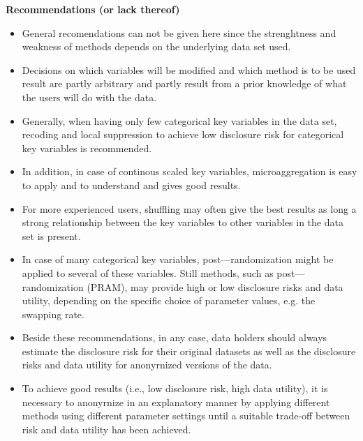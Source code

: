 \documentclass{beamer}
\begin{document}
\begin{frame}
	\textbf{Recommendations (or lack thereof)}
	\begin{itemize}
		\item General recomendations can not be given here since the strenghtness and weakness of methods
		depends on the underlying data set used.
		\item  Decisions on which variables will be
		modiﬁed and which method is to be used result are partly arbitrary and partly
		result from a prior knowledge of what the users will do with the data.
	\end{itemize}
\end{frame}
\begin{frame}
	\begin{itemize}
		\item Generally, when having only few categorical key variables in the data set, recoding and local suppression to achieve low disclosure risk for categorical key
		variables is recommended. 
		\item In addition, in case of continous scaled key variables,
		microaggregation is easy to apply and to understand and gives good results.
		\item  For
		more experienced users, shuffling may often give the best results as long a strong
		relationship between the key variables to other variables in the data set is present.
		
	\end{itemize}
\end{frame}
\begin{frame}
	\begin{itemize}
		\item In case of many categorical key variables, post—randomization might be applied
		to several of these variables. Still methods, such as post—randomization (PRAM),
		may provide high or low disclosure risks and data utility, depending on the speciﬁc
		choice of parameter values, e.g. the swapping rate.
	\end{itemize}
\end{frame}
\begin{frame}
	\begin{itemize}
		\item Beside these recommendations, in any case, data holders should always estimate
		the disclosure risk for their original datasets as well as the disclosure risks and
		data utility for anonyrnized versions of the data. 
		\item To achieve good results (i.e., low
		disclosure risk, high data utility), it is necessary to anonyrnize in an explanatory
		manner by applying different methods using different parameter settings until a
		suitable trade-off between risk and data utility has been achieved.
	\end{itemize}
\end{frame}
\end{document}

